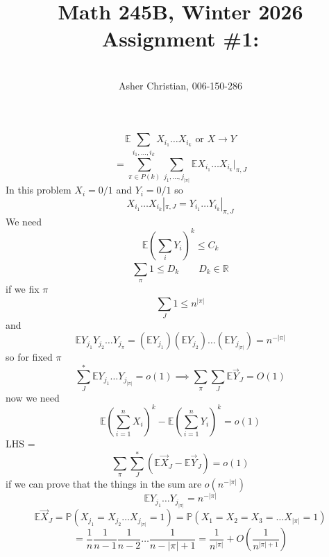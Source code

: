 \documentclass[11pt]{article}
\newcommand{\cnum}{Math 245B}
\newcommand{\ced}{Winter 2026}
\newcommand{\ctitle}[4]{\title{\vspace{-0.5in}\cnum, \ced\\Assignment #1: #2}\author{\vspace{-0.35in}\\#3, #4}}
\begin{document}
\ctitle{\#1}{}{Asher Christian}{006-150-286}
\date{}
\maketitle
\[
    \mathbb{E} \sum_{i_1,\dots,i_k}^{}X_{i_1}\dots X_{i_k} \text{ or } X \rightarrow Y
\] 
\[
    =\sum_{\pi \in P(k)}^{}\sum_{j_1,\dots,j_{|\pi|}}^{} \mathbb{E} X_{i_1}\dots X_{i_k}|_{\pi, J}
\] 
In this problem $X_i = 0/1$ and $Y_i = 0 / 1$ so
 \[
     X_{i_1}\dots X_{i_k} |_{\pi,J} = Y_{i_1}\dots Y_{i_k} |_{\pi, J}
\] 
We need
\[
\mathbb{E}(\sum_{i}^{}Y_i)^{k} \le C_k
\] 
\[
\sum_{\pi }^{}1 \le D_k \qquad D_k \in \mathbb{R}
\] 
if we fix $\pi$
\[
\sum_{J}^{}1 \le n^{|\pi|}
\] 
and
\[
    \mathbb{E}Y_{j_1}Y_{j_2}\dots Y_{j_{\pi}} = ( \mathbb{E} Y_{j_1})( \mathbb{E} Y_{j_2}) \dots (\mathbb{E}Y_{j_{|\pi|}}) = n^{-|\pi|}
\] 
so for fixed $\pi$
\[
    \sum_{J}^{*} \mathbb{E} Y_{j_1}\dots Y_{j_{|\pi|}} = o(1) \implies \sum_{\pi }^{ } \sum_{J}^{} \mathbb{E} \vec{Y}_J = O(1)
\] 
now we need
\[
\mathbb{E}(\sum_{i=1}^{n} X_i)^{k} - \mathbb{E}(\sum_{i=1}^{n}Y_i)^{k} = o(1)
\] 
LHS =
\[
\sum_{\pi }^{} \sum_{ J}^{*}\left( \mathbb{E}\vec X_J - \mathbb{E} \vec Y_J\right) = o(1)
\] 
if we can prove that the things in the sum are $o(n^{-|\pi|})$
\[
    \mathbb{E} Y_{j_1}\dots Y_{j_{|\pi|}} = n^{-|\pi|}
\] 
\[
\mathbb{E}\vec X_J = \mathbb{P}(X_{j_1} = X_{j_2}\dots X_{j_{|\pi|}} = 1) = \mathbb{P}(X_1 = X_2 = X_3 = \dots X_{|\pi|} = 1) 
\]
\[
= \frac{1}{n} \frac{1}{n-1} \frac{1}{n-2} \dots \frac{1}{n-|\pi| + 1} = \frac{1}{n^{|\pi|}} + O(\frac{1}{n^{|\pi| + 1}})
\] 
\end{document}
